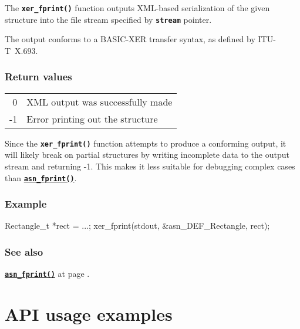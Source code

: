 \documentclass[english,oneside,12pt]{book}
\newcommand{\api}[2]{\hyperref[#1]{\code{#2}}}
\newcommand{\seealso}[2]{\api{#1}{#2} at page \pageref{#1}}
\newcommand{\code}[1]{\texttt{\textbf{\lstinline{#1}}}}
\begin{document}
The \code{xer_fprint()} function outputs XML-based serialization
of the given structure into the file stream specified by
\code{stream} pointer.

The output conforms to a BASIC-XER transfer syntax, as defined by ITU-T~X.693.

\subsection*{Return values}

\begin{tabular}[h!]{rl}
0 & XML output was successfully made \\
-1 & Error printing out the structure
\end{tabular}

\noindent{}Since the \code{xer_fprint()} function attempts to produce a conforming output,
it will likely break on partial structures by writing incomplete data
to the output stream and returning -1. This makes it less suitable for
debugging complex cases than \api{sec:asn_fprint}{asn_fprint()}.

\subsection*{Example}
\begin{example}
Rectangle_t *rect = ...;
xer_fprint(stdout, &asn_DEF_Rectangle, rect);
\end{example}

\subsection*{See also}
\seealso{sec:asn_fprint}{asn_fprint()}.

\chapter{API usage examples}
\end{document}
